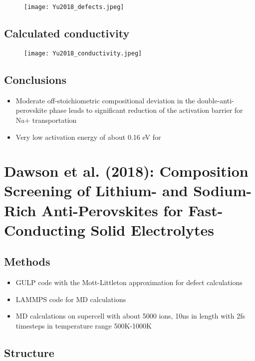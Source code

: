 \documentclass[10pt,a4paper, titlepage]{article}
\begin{document}
\begin{figure}[H]
\centering
\texttt{[image: Yu2018\_defects.jpeg]}
\end{figure}

\subsection{Calculated conductivity}

\begin{figure}[H]
\centering
\texttt{[image: Yu2018\_conductivity.jpeg]}
\end{figure}

\subsection{Conclusions}

\begin{itemize}
  \item Moderate off-stoichiometric compositional deviation in the double-anti-perovskite phase leads to significant reduction of the activation barrier for Na+ transportation
  \item Very low activation energy of about 0.16 eV for 
\end{itemize}

\section{Dawson et al. (2018): Composition Screening of Lithium- and Sodium-Rich Anti-Perovskites for Fast-Conducting Solid Electrolytes}

\subsection{Methods}

\begin{itemize}
  \item GULP code with the Mott-Littleton approximation for defect calculations
  \item LAMMPS code for MD calculations
  \item MD calculations on supercell with about 5000 ions, 10ns in length with 2fs timesteps in temperature range 500K-1000K
\end{itemize}

\subsection{Structure}
\end{document}
